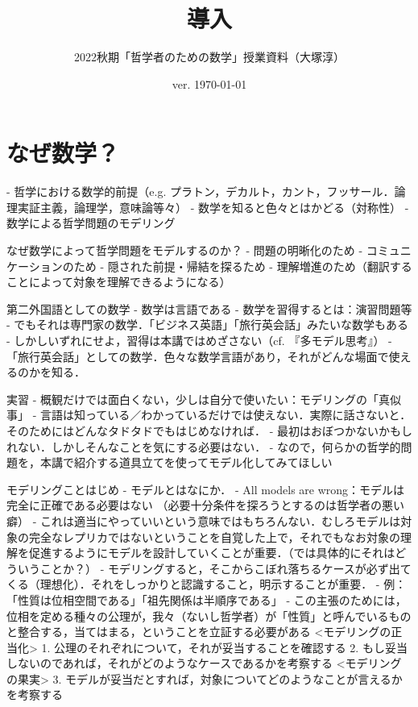 \documentclass[11pt,a4paper, uplatex]{jsarticle}
\begin{document}
\title{導入}
\author{2022秋期「哲学者のための数学」授業資料（大塚淳）}
\date{ver. \today}
\maketitle

\section{なぜ数学？}
- 哲学における数学的前提（e.g. プラトン，デカルト，カント，フッサール．論理実証主義，論理学，意味論等々）
- 数学を知ると色々とはかどる（対称性）
- 数学による哲学問題のモデリング

なぜ数学によって哲学問題をモデルするのか？
- 問題の明晰化のため
- コミュニケーションのため
- 隠された前提・帰結を探るため
- 理解増進のため（翻訳することによって対象を理解できるようになる）

第二外国語としての数学
- 数学は言語である
- 数学を習得するとは：演習問題等
- でもそれは専門家の数学．「ビジネス英語」「旅行英会話」みたいな数学もある
- しかしいずれにせよ，習得は本講ではめざさない（cf. 『多モデル思考』）
- 「旅行英会話」としての数学．色々な数学言語があり，それがどんな場面で使えるのかを知る．

実習
- 概観だけでは面白くない，少しは自分で使いたい：モデリングの「真似事」
- 言語は知っている／わかっているだけでは使えない．実際に話さないと．そのためにはどんなタドタドでもはじめなければ．
- 最初はおぼつかないかもしれない．しかしそんなことを気にする必要はない．
- なので，何らかの哲学的問題を，本講で紹介する道具立てを使ってモデル化してみてほしい

モデリングことはじめ
- モデルとはなにか．
- All models are wrong：モデルは完全に正確である必要はない
    （必要十分条件を探ろうとするのは哲学者の悪い癖）
- これは適当にやっていいという意味ではもちろんない．むしろモデルは対象の完全なレプリカではないということを自覚した上で，それでもなお対象の理解を促進するようにモデルを設計していくことが重要．（では具体的にそれはどういうことか？）
- モデリングすると，そこからこぼれ落ちるケースが必ず出てくる（理想化）．それをしっかりと認識すること，明示することが重要．
- 例：「性質は位相空間である」「祖先関係は半順序である」
- この主張のためには，位相を定める種々の公理が，我々（ないし哲学者）が「性質」と呼んでいるものと整合する，当てはまる，ということを立証する必要がある
<モデリングの正当化> 
1. 公理のそれぞれについて，それが妥当することを確認する
2. もし妥当しないのであれば，それがどのようなケースであるかを考察する
<モデリングの果実>
3. モデルが妥当だとすれば，対象についてどのようなことが言えるかを考察する
\end{document}
